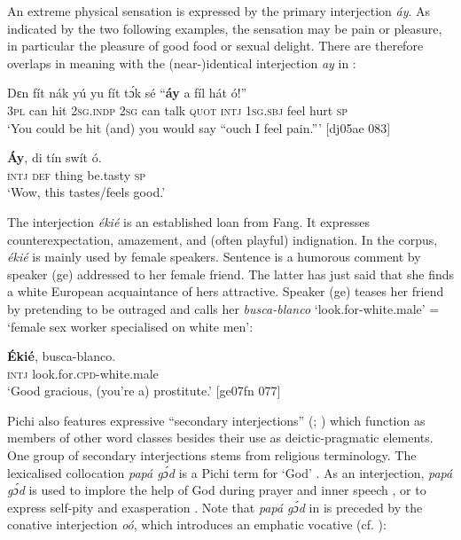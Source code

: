 An extreme physical sensation is expressed by the primary interjection \textit{áy}. As indicated by the two following examples, the sensation may be pain or pleasure, in particular the pleasure of good food or sexual delight. There are therefore overlaps in meaning with the (near-)identical interjection \textit{ay} in :


\ea%
    \label{ex:key:1637}
    \gll Dɛn  fít  nák  yú    yu  fít  tɔ́k  sé
“\textbf{áy}  a    fíl  hát  ó!”\\
\textsc{3pl}  can  hit  \textsc{2sg.indp}  \textsc{2sg}  can  talk  \textsc{quot}  
\textsc{intj}  \textsc{1sg.sbj}  feel  hurt  \textsc{sp}\\

\glt ‘You could be hit (and) you would say “ouch I feel pain.”’ [dj05ae 083]
\z


\ea%
    \label{ex:key:1638}
    \gll \textbf{\'{A}y},  di  tín    swít    ó.\\
\textsc{intj}  \textsc{def}  thing  be.tasty  \textsc{sp}\\

\glt ‘Wow, this tastes/feels good.’
\z

The interjection \textit{ékié} is an established loan from Fang. It expresses counterexpectation, amazement, and (often playful) indignation. In the corpus, \textit{ékié} is mainly used by female speakers. Sentence  is a humorous comment by speaker (ge) addressed to her female friend. The latter has just said that she finds a white European acquaintance of hers attractive. Speaker (ge) teases her friend by pretending to be outraged and calls her \textit{busca-blanco} ‘look.for-white.male’ = ‘female sex worker specialised on white men’: 

\ea%
    \label{ex:key:1639}
    \gll \textbf{\'{E}kié},  busca-blanco.\\
\textsc{intj}    look.for.\textsc{cpd}{}-white.male\\

\glt ‘Good gracious, (you’re a) prostitute.’ [ge07fn 077]
\z

Pichi also features expressive “secondary interjections” (\citealt[176]{Bloomfield1935}; \citealt{Ameka1992a}) which function as members of other word classes besides their use as deictic-pragmatic elements. One group of secondary interjections stems from religious terminology. The lexicalised collocation \textit{papá gɔ́d} is a Pichi term for ‘God’ . As an interjection,\textit{ papá gɔ́d} is used to implore the help of God during prayer and inner speech , or to express self-pity and exasperation . Note that \textit{papá gɔ́d} in  is preceded by the conative interjection \textit{oó}, which introduces an emphatic vocative (cf. ):


